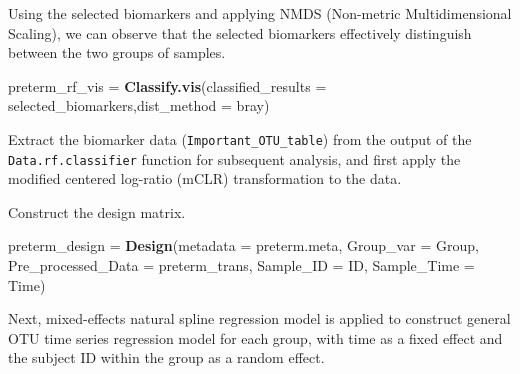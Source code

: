 \documentclass[
]{article}
\newenvironment{Shaded}{\begin{snugshade}}{\end{snugshade}}
\newcommand{\AttributeTok}[1]{\textcolor[rgb]{0.13,0.29,0.53}{#1}}
\newcommand{\FunctionTok}[1]{\textcolor[rgb]{0.13,0.29,0.53}{\textbf{#1}}}
\newcommand{\NormalTok}[1]{#1}
\newcommand{\OtherTok}[1]{\textcolor[rgb]{0.56,0.35,0.01}{#1}}
\newcommand{\SpecialCharTok}[1]{\textcolor[rgb]{0.81,0.36,0.00}{\textbf{#1}}}
\newcommand{\StringTok}[1]{\textcolor[rgb]{0.31,0.60,0.02}{#1}}
\begin{document}
Using the selected biomarkers and applying NMDS (Non-metric
Multidimensional Scaling), we can observe that the selected biomarkers
effectively distinguish between the two groups of samples.

\begin{Shaded}
\begin{Highlighting}[]
\NormalTok{preterm\_rf\_vis }\OtherTok{=} \FunctionTok{Classify.vis}\NormalTok{(}\AttributeTok{classified\_results =}\NormalTok{ selected\_biomarkers,}\AttributeTok{dist\_method =} \StringTok{\textquotesingle{}bray\textquotesingle{}}\NormalTok{)}
\end{Highlighting}
\end{Shaded}

Extract the biomarker data (\texttt{Important\_OTU\_table}) from the
output of the \texttt{Data.rf.classifier} function for subsequent
analysis, and first apply the modified centered log-ratio (mCLR)
transformation to the data.

\begin{Shaded}
\end{Shaded}

Construct the design matrix.

\begin{Shaded}
\begin{Highlighting}[]
\NormalTok{preterm\_design }\OtherTok{=} \FunctionTok{Design}\NormalTok{(}\AttributeTok{metadata =}\NormalTok{ preterm.meta,}
                        \AttributeTok{Group\_var =} \StringTok{\textquotesingle{}Group\textquotesingle{}}\NormalTok{,}
                        \AttributeTok{Pre\_processed\_Data =}\NormalTok{ preterm\_trans,}
                        \AttributeTok{Sample\_ID =} \StringTok{\textquotesingle{}ID\textquotesingle{}}\NormalTok{,}
                        \AttributeTok{Sample\_Time =} \StringTok{\textquotesingle{}Time\textquotesingle{}}\NormalTok{)}
\end{Highlighting}
\end{Shaded}

Next, mixed-effects natural spline regression model is applied to
construct general OTU time series regression model for each group, with
time as a fixed effect and the subject ID within the group as a random
effect.
\end{document}
